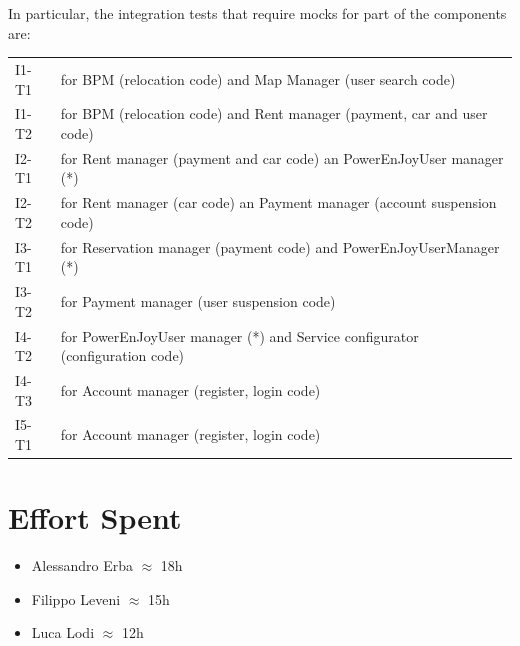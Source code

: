 \documentclass[english]{article}
\begin{document}
In particular, the integration tests that require mocks for part of the components are:
\begin{tabular}{l | p{7cm}}
I1-T1 & for BPM (relocation code) and Map Manager (user search code)\\ 
I1-T2 & for BPM (relocation code) and Rent manager (payment, car and user code)\\
I2-T1 & for Rent manager (payment and car code) an PowerEnJoyUser manager (*) \\
I2-T2 & for Rent manager (car code) an Payment manager (account suspension code) \\
I3-T1 & for Reservation manager (payment code) and PowerEnJoyUserManager (*)\\
I3-T2 & for Payment manager (user suspension code) \\
I4-T2 & for PowerEnJoyUser manager (*) and Service configurator (configuration code) \\
I4-T3 & for Account manager (register, login code) \\
I5-T1 & for Account manager (register, login code) \\

     
\end{tabular}

\clearpage
\section{Effort Spent} %
	\begin{itemize}
		\item Alessandro Erba $\approx$ 18h
		\item Filippo Leveni 	$\approx$ 15h
		\item Luca Lodi $\approx$ 12h
	\end{itemize}
\end{document}
